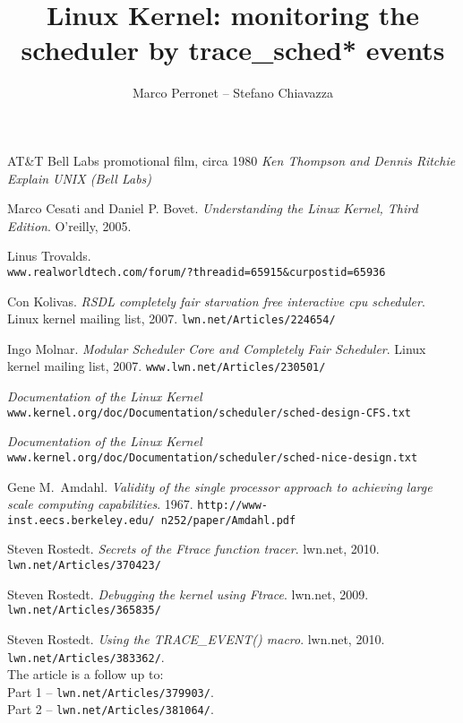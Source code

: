 \documentclass[10pt, oneside]{book}
\author{Marco Perronet -- Stefano Chiavazza}
\title{Linux Kernel: monitoring the scheduler by trace\_sched* events}
\date{}
\begin{document}
\frontmatter

\begin{titlepage}
\maketitle  
\end{titlepage}

\tableofcontents
\listoffigures



\mainmatter







% 

\begin{thebibliography}{}
AT\&T Bell Labs promotional film, circa 1980
\textit{Ken Thompson and Dennis Ritchie Explain UNIX (Bell Labs)} %

Marco Cesati and Daniel P. Bovet.
\textit{Understanding the Linux Kernel, Third Edition}.
O'reilly, 2005.

Linus Trovalds.\\
\texttt{www.realworldtech.com/forum/?threadid=65915\&curpostid=65936}

Con Kolivas.
\textit{RSDL completely fair starvation free interactive cpu scheduler}.
Linux kernel mailing list, 2007. 
\texttt{lwn.net/Articles/224654/}

Ingo Molnar.
\textit{Modular Scheduler Core and Completely Fair Scheduler}.
Linux kernel mailing list, 2007. 
\texttt{www.lwn.net/Articles/230501/}

\textit{Documentation of the Linux Kernel}\\
\texttt{www.kernel.org/doc/Documentation/scheduler/sched-design-CFS.txt}

\textit{Documentation of the Linux Kernel}\\
\texttt{www.kernel.org/doc/Documentation/scheduler/sched-nice-design.txt}

Gene M.\ Amdahl.
\textit{Validity of the single processor approach to achieving large scale
computing capabilities}.
1967.
\texttt{http://www-inst.eecs.berkeley.edu/~n252/paper/Amdahl.pdf}

Steven Rostedt.
\textit{Secrets of the Ftrace function tracer}.
lwn.net, 2010.
\texttt{lwn.net/Articles/370423/}

Steven Rostedt.
\textit{Debugging the kernel using Ftrace}.
lwn.net, 2009.
\texttt{lwn.net/Articles/365835/}

Steven Rostedt.
\textit{Using the TRACE\_EVENT() macro}.
lwn.net, 2010.
\texttt{lwn.net/Articles/383362/}.\\
The article is a follow up to:\\
Part 1 -- \texttt{lwn.net/Articles/379903/}.\\
Part 2 -- \texttt{lwn.net/Articles/381064/}.
\end{thebibliography}
\end{document}
